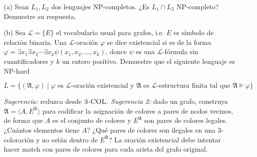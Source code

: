 
\begin{enumerate}
	\item[(a)] Sean $L_1,L_2$ dos lenguajes NP-completos. ¿Es $L_1\cap L_2$ NP-completo? Demuestre su respuesta.
	\item[(b)] Sea $\mathcal{L}=\{E\}$ el vocabulario usual para grafos, i.e. $E$ es símbolo de relación binaria. Una $\mathcal{L}$-oración $\varphi$ se dice existencial si es de la forma $\varphi=\exists x_1\exists x_2\cdots \exists x_k\psi(x_1,x_2,\ldots,x_k)$, donce $\psi$ es una $\mathcal{L}$-fórmula sin cuantificadores y $k$ un entero positivo. Demuestre que el siguiente lenguaje es NP-hard
	\begin{center}
		$L=\{(\mathfrak{A},\varphi)\mid \varphi\text{ es }\mathcal{L}\text{-oración existencial y }\mathfrak{A}\text{ es }\mathcal{L}\text{-estructura finita tal que }\mathfrak{A}\models\varphi\}$
	\end{center}
	\textit{Sugerencia:} reduzca desde $\textsc{3-COL}$. \textit{Sugerencia 2:} dado un grafo, construya $\mathfrak{A}=\langle A,E^\mathfrak{A}\rangle$ para codificar la asignación de colores a pares de nodos vecinos, de forma que $A$ es el conjunto de colores y $E^\mathfrak{A}$ son pares de colores legales. ¿Cuántos elementos tiene $A$? ¿Qué pares de colores son ilegales en una 3-coloración y no están dentro de $E^\mathfrak{A}$? La oración existencial debe intentar hacer match con pares de colores para cada arista del grafo original.

\end{enumerate}